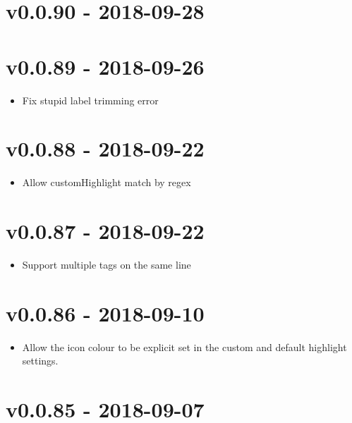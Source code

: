 \chapter{v0.0.90 - 2018-09-28}

\chapter{v0.0.89 - 2018-09-26}
\begin{itemize}
\item{Fix stupid label trimming error}
\end{itemize}

\chapter{v0.0.88 - 2018-09-22}
\begin{itemize}
\item{Allow customHighlight match by regex}
\end{itemize}

\chapter{v0.0.87 - 2018-09-22}
\begin{itemize}
\item{Support multiple tags on the same line}
\end{itemize}

\chapter{v0.0.86 - 2018-09-10}
\begin{itemize}
\item{Allow the icon colour to be explicit set in the custom and default highlight settings.}
\end{itemize}

\chapter{v0.0.85 - 2018-09-07}

